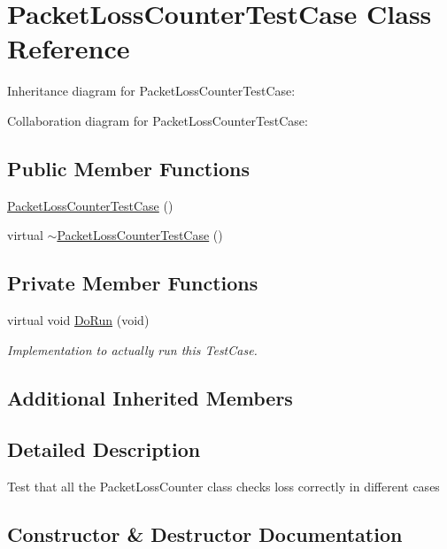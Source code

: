 \hypertarget{classPacketLossCounterTestCase}{}\section{Packet\+Loss\+Counter\+Test\+Case Class Reference}
\label{classPacketLossCounterTestCase}


Inheritance diagram for Packet\+Loss\+Counter\+Test\+Case\+:


Collaboration diagram for Packet\+Loss\+Counter\+Test\+Case\+:
\subsection*{Public Member Functions}
\begin{DoxyCompactItemize}
\item 
\hyperlink{classPacketLossCounterTestCase_a1e53b32578b068f9661da7c236fbb967}{Packet\+Loss\+Counter\+Test\+Case} ()
\item 
virtual \hyperlink{classPacketLossCounterTestCase_a8714386697469ffe091070739730b51d}{$\sim$\+Packet\+Loss\+Counter\+Test\+Case} ()
\end{DoxyCompactItemize}
\subsection*{Private Member Functions}
\begin{DoxyCompactItemize}
\item 
virtual void \hyperlink{classPacketLossCounterTestCase_a693d432341eff87a2dd0b1b54e70f9db}{Do\+Run} (void)
\begin{DoxyCompactList}\small\item\em Implementation to actually run this Test\+Case. \end{DoxyCompactList}\end{DoxyCompactItemize}
\subsection*{Additional Inherited Members}


\subsection{Detailed Description}
Test that all the Packet\+Loss\+Counter class checks loss correctly in different cases 

\subsection{Constructor \& Destructor Documentation}
